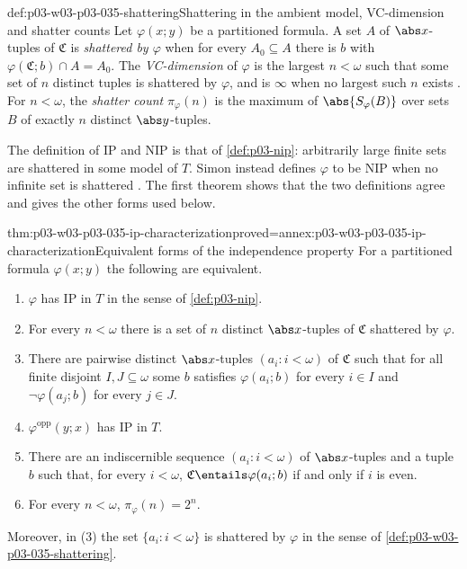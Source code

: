 \begin{hbdefinition}{def:p03-w03-p03-035-shattering}{Shattering in the ambient model, VC-dimension and shatter counts}
Let \(\varphi(x;y)\) be a partitioned formula.  A set \(A\) of
\(\abs x\)-tuples of \(\mathfrak C\) is \emph{shattered by \(\varphi\)} when
for every \(A_0\subseteq A\) there is \(b\) with
\(\varphi(\mathfrak C;b)\cap A=A_0\).  The \emph{VC-dimension} of
\(\varphi\) is the largest \(n<\omega\) such that some set of \(n\) distinct
tuples is shattered by \(\varphi\), and is \(\infty\) when no largest such
\(n\) exists \cite[Remark~2.3, p.~14]{Simon2015GuideManuscript}.  For
\(n<\omega\), the \emph{shatter count} \(\pi_\varphi(n)\) is the maximum of
\(\abs{S_\varphi(B)}\) over sets \(B\) of exactly \(n\) distinct
\(\abs y\)-tuples.
\end{hbdefinition}

The definition of IP and NIP is that of \cref{def:p03-nip}: arbitrarily
large finite sets are shattered in some model of \(T\).  Simon instead
defines \(\varphi\) to be NIP when no infinite set is shattered
\cite[Definition~2.1, p.~13]{Simon2015GuideManuscript}.  The first theorem
shows that the two definitions agree and gives the other forms used below.

\begin{hbtheorem}{thm:p03-w03-p03-035-ip-characterization}{proved=annex:p03-w03-p03-035-ip-characterization}{Equivalent forms of the independence property}
For a partitioned formula \(\varphi(x;y)\) the following are equivalent.
\begin{enumerate}
  \item \(\varphi\) has IP in \(T\) in the sense of \cref{def:p03-nip}.
  \item For every \(n<\omega\) there is a set of \(n\) distinct
        \(\abs x\)-tuples of \(\mathfrak C\) shattered by \(\varphi\).
  \item There are pairwise distinct \(\abs x\)-tuples \((a_i:i<\omega)\) of
        \(\mathfrak C\) such that for all finite disjoint
        \(I,J\subseteq\omega\) some \(b\) satisfies \(\varphi(a_i;b)\) for
        every \(i\in I\) and \(\neg\varphi(a_j;b)\) for every \(j\in J\).
  \item \(\varphi^{\mathrm{opp}}(y;x)\) has IP in \(T\).
  \item There are an indiscernible sequence \((a_i:i<\omega)\) of
        \(\abs x\)-tuples and a tuple \(b\) such that, for every
        \(i<\omega\), \(\mathfrak C\entails\varphi(a_i;b)\) if and only if
        \(i\) is even.
  \item For every \(n<\omega\), \(\pi_\varphi(n)=2^n\).
\end{enumerate}
Moreover, in \textup{(3)} the set \(\{a_i:i<\omega\}\) is shattered by
\(\varphi\) in the sense of \cref{def:p03-w03-p03-035-shattering}.
\end{hbtheorem}

